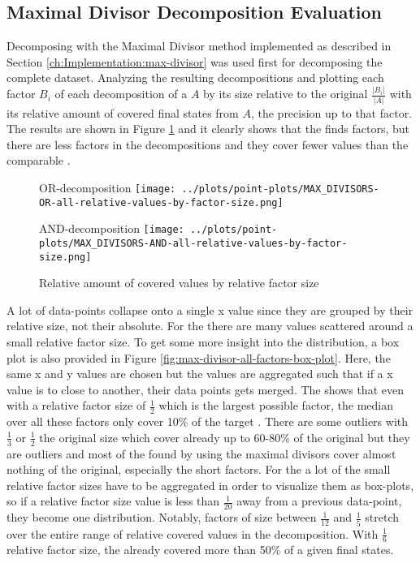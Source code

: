 \subsection{Maximal Divisor Decomposition Evaluation}
Decomposing with the Maximal Divisor method implemented as described in Section \ref{ch:Implementation:max-divisor} was used first for decomposing the complete dataset. Analyzing the resulting decompositions and plotting each factor $B_i$ of each decomposition of a \DFA $A$ by its size relative to the original $\frac{|B_i|}{|A|}$ with its relative amount of covered final states from $A$, the precision up to that factor. The results are shown in Figure \ref{fig:max-divisor-all-factors} and it clearly shows that the \orDecomp finds factors, but there are less factors in the decompositions and they cover fewer values than the comparable \andDecomp.
\begin{figure}[h]
	\begin{minipage}[h]{0.49\linewidth}
		\centering
		OR-decomposition
	\texttt{[image: ../plots/point-plots/MAX\_DIVISORS-OR-all-relative-values-by-factor-size.png]}
	\end{minipage}
	\begin{minipage}[h]{0.49\linewidth}
		\centering
		AND-decomposition
	\texttt{[image: ../plots/point-plots/MAX\_DIVISORS-AND-all-relative-values-by-factor-size.png]}
\end{minipage}
\caption{Relative amount of covered values by relative factor size}
\label{fig:max-divisor-all-factors}
\end{figure}
A lot of data-points collapse onto a single x value since they are grouped by their relative size, not their absolute. For the \andDecomp there are many values scattered around a small relative factor size. To get some more insight into the distribution, a box plot is also provided in Figure \ref{fig:max-divisor-all-factors-box-plot}. Here, the same x and y values are chosen but the values are aggregated such that if a x value is to close to another, their data points gets merged. The \orDecomp shows that even with a relative factor size of $\frac{1}{2}$ which is the largest possible factor, the median over all these factors only cover 10\% of the target \DFA. There are some outliers with $\frac{1}{3}$ or $\frac{1}{2}$ the original size which cover already up to 60-80\% of the original \DFA but they are outliers and most of the \orDecomp found by using the maximal divisors cover almost nothing of the original, especially the short factors. For the \andDecomp a lot of the small relative factor sizes have to be aggregated in order to visualize them as box-plots, so if a relative factor size value is less than $\frac{1}{20}$ away from a previous data-point, they become one distribution. Notably, factors of size between $\frac{1}{12}$ and $\frac{1}{5}$ stretch over the entire range of relative covered values in the decomposition. With $\frac{1}{6}$ relative factor size, the \andDecomp already covered more than 50\% of a given \DFAs final states.

